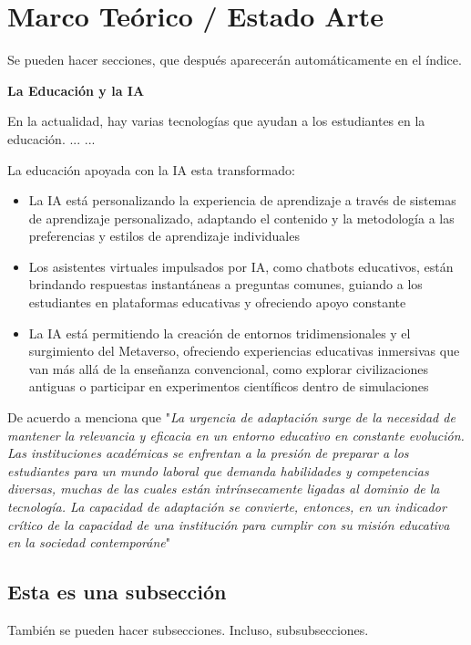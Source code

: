 \documentclass[a4paper,12pt]{article}
\begin{document}
{\section{Marco Teórico / Estado Arte}

Se pueden hacer secciones, que después aparecerán automáticamente en el índice.

\textbf{La Educación y la IA}

En la actualidad, hay varias tecnologías que ayudan a los estudiantes en la educación.
...
...

La educación apoyada con la IA esta transformado:


\begin{itemize}
    \item La IA está personalizando la experiencia de aprendizaje a través de sistemas de aprendizaje personalizado, adaptando el contenido y la metodología a las preferencias y estilos de aprendizaje individuales \cite{munoz}
    \item Los asistentes virtuales impulsados por IA, como chatbots educativos, están brindando respuestas instantáneas a preguntas comunes, guiando a los estudiantes en plataformas educativas y ofreciendo apoyo constante
    \item La IA está permitiendo la creación de entornos tridimensionales y el surgimiento del Metaverso, ofreciendo experiencias educativas inmersivas que van más allá de la enseñanza convencional, como explorar civilizaciones antiguas o participar en experimentos científicos dentro de simulaciones
\end{itemize}

De acuerdo a \cite{munoz}  menciona que "\textit{La urgencia de adaptación surge de la necesidad de mantener la relevancia y eficacia en un entorno educativo en constante evolución. Las instituciones académicas se
enfrentan a la presión de preparar a los estudiantes para un mundo laboral que demanda
habilidades y competencias diversas, muchas de las cuales están intrínsecamente ligadas
al dominio de la tecnología. La capacidad de adaptación se convierte, entonces, en un
indicador crítico de la capacidad de una institución para cumplir con su misión educativa en
la sociedad contemporáne}"


\subsection{Esta es una subsección}

También se pueden hacer subsecciones. Incluso, subsubsecciones.

}
\end{document}
